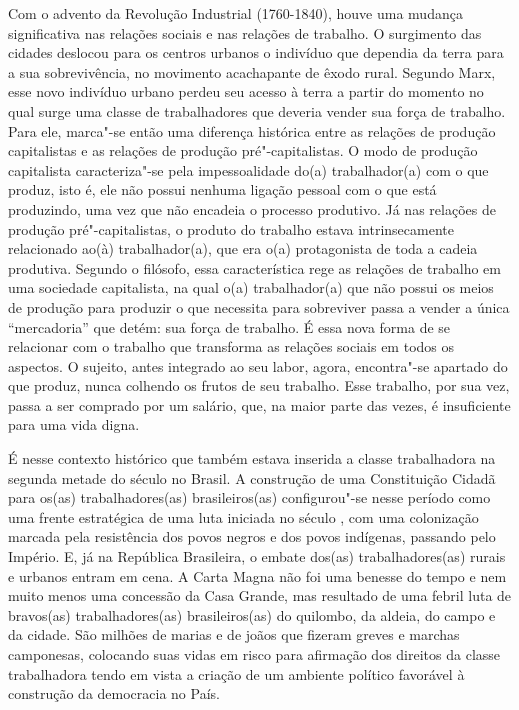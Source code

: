 Com o advento da Revolução Industrial (1760-1840), houve uma mudança
significativa nas relações sociais e nas relações de trabalho. O
surgimento das cidades deslocou para os centros urbanos
o indivíduo que dependia da terra para a
sua sobrevivência, no movimento acachapante de
êxodo rural. Segundo Marx, esse novo indivíduo urbano perdeu seu acesso
à terra a partir do momento no qual surge uma classe de trabalhadores
que deveria vender sua força de trabalho.
Para ele, marca"-se então uma diferença
histórica entre as relações de produção capitalistas e as relações de
produção pré"-capitalistas. O modo de produção capitalista caracteriza"-se
pela impessoalidade do(a) trabalhador(a) com o que produz, isto é, ele
não possui nenhuma ligação pessoal com o que está produzindo, uma vez
que não encadeia o processo produtivo. Já nas relações de produção
pré"-capitalistas, o produto do trabalho estava intrinsecamente
relacionado ao(à) trabalhador(a), que era o(a) protagonista de toda a
cadeia produtiva. Segundo o filósofo, essa característica rege as
relações de trabalho em uma sociedade capitalista, na qual o(a)
trabalhador(a) que não possui os meios de produção para produzir o que
necessita para sobreviver passa a vender a única ``mercadoria'' que
detém: sua força de trabalho. É essa nova forma de se relacionar com o
trabalho que transforma as relações sociais em todos os aspectos. O
sujeito, antes integrado ao seu labor, agora, encontra"-se apartado do
que produz, nunca colhendo os frutos de seu trabalho. Esse trabalho, por
sua vez, passa a ser comprado por um salário, que, na maior parte das
vezes, é insuficiente para uma vida digna.

É nesse contexto histórico que também estava inserida a classe
trabalhadora na segunda metade do século  no Brasil. A construção de
uma Constituição Cidadã para os(as) trabalhadores(as) brasileiros(as)
configurou"-se nesse período como uma frente estratégica de uma luta
iniciada no século , com uma colonização marcada pela resistência dos
povos negros e dos povos indígenas, passando pelo Império. E, já na
República Brasileira, o embate dos(as) trabalhadores(as) rurais e
urbanos entram em cena. A Carta Magna não foi uma benesse do tempo e nem
muito menos uma concessão da Casa Grande, mas resultado de uma febril
luta de bravos(as) trabalhadores(as) brasileiros(as) do quilombo, da
aldeia, do campo e da cidade. São milhões de marias e de joãos que
fizeram greves e marchas camponesas, colocando suas vidas em risco para
afirmação dos direitos da classe trabalhadora tendo em vista a criação
de um ambiente político favorável à construção da democracia no País.

